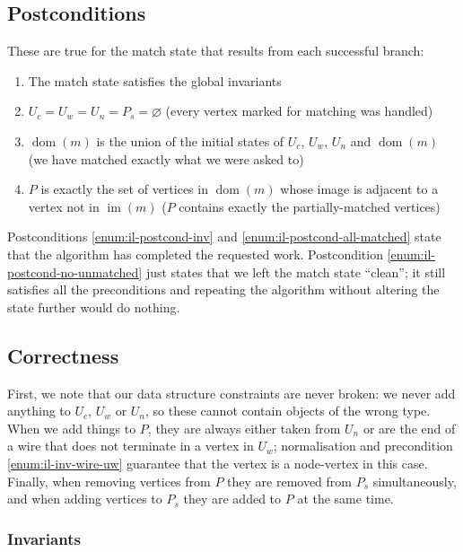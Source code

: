 \documentclass{article}
\DeclareMathOperator{\dom}{dom}
\DeclareMathOperator{\im}{im}
\begin{document}
\subsection{Postconditions}
These are true for the match state that results from each successful branch:
\begin{enumerate}
  \renewcommand{\theenumi}{(\Roman{enumi})}
  \renewcommand{\labelenumi}{\theenumi}
  \item \label{enum:il-postcond-inv} The match state satisfies the global invariants
  \item \label{enum:il-postcond-no-unmatched} $U_c = U_w = U_n = P_s = \varnothing$ (every vertex marked for matching was handled)
  \item \label{enum:il-postcond-all-matched} $\dom(m)$ is the union of the initial states of $U_c$, $U_w$, $U_n$ and $\dom(m)$ (we have matched exactly what we were asked to)
  \item \label{enum:il-postcond-P} $P$ is exactly the set of vertices in $\dom(m)$ whose image is adjacent to a vertex not in $\im(m)$ ($P$ contains exactly the partially-matched vertices)
\end{enumerate}

Postconditions \ref{enum:il-postcond-inv} and \ref{enum:il-postcond-all-matched} state that the algorithm has completed the requested work.  Postcondition \ref{enum:il-postcond-no-unmatched} just states that we left the match state ``clean''; it still satisfies all the preconditions and repeating the algorithm without altering the state further would do nothing.

\subsection{Correctness}

First, we note that our data structure constraints are never broken: we never add anything to $U_c$, $U_w$ or $U_n$, so these cannot contain objects of the wrong type.  When we add things to $P$, they are always either taken from $U_n$ or are the end of a wire that does not terminate in a vertex in $U_w$; normalisation and precondition \ref{enum:il-inv-wire-uw} guarantee that the vertex is a node-vertex in this case.  Finally, when removing vertices from $P$ they are removed from $P_s$ simultaneously, and when adding vertices to $P_s$ they are added to $P$ at the same time.

\subsubsection{Invariants}
\end{document}
